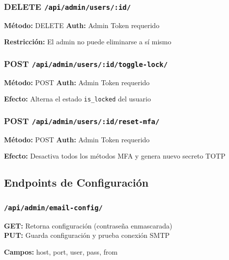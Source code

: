 \documentclass[12pt,a4paper,openany]{article}
\begin{document}
\subsubsection{DELETE \texttt{/api/admin/users/:id/}}

\begin{infobox}
\textbf{Método:} DELETE \quad \textbf{Auth:} Admin Token requerido

\textbf{Restricción:} El admin no puede eliminarse a sí mismo
\end{infobox}

\subsubsection{POST \texttt{/api/admin/users/:id/toggle-lock/}}

\begin{infobox}
\textbf{Método:} POST \quad \textbf{Auth:} Admin Token requerido

\textbf{Efecto:} Alterna el estado \texttt{is\_locked} del usuario
\end{infobox}

\subsubsection{POST \texttt{/api/admin/users/:id/reset-mfa/}}

\begin{infobox}
\textbf{Método:} POST \quad \textbf{Auth:} Admin Token requerido

\textbf{Efecto:} Desactiva todos los métodos MFA y genera nuevo secreto TOTP
\end{infobox}

\subsection{Endpoints de Configuración}

\subsubsection{\texttt{/api/admin/email-config/}}

\begin{infobox}
\textbf{GET:} Retorna configuración (contraseña enmascarada) \\
\textbf{PUT:} Guarda configuración y prueba conexión SMTP

\textbf{Campos:} host, port, user, pass, from
\end{infobox}
\end{document}
